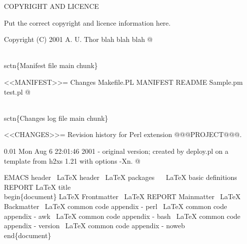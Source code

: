 \documentclass[11pt]{article}
\def\nwendcode{\endtrivlist \endgroup} %
\let\nwdocspar=\par                    %
\begin{document}
COPYRIGHT AND LICENCE

Put the correct copyright and licence information here.

Copyright (C) 2001 A. U. Thor blah blah blah
@ 
\nwendcode{}\nwdocspar

\nwenddocs{}\plusendmoddef
\\sctn\{Manifest file main chunk\}

<<MANIFEST>>=
Changes
Makefile.PL
MANIFEST
README
Sample.pm
test.pl
@ 
\nwendcode{}\nwdocspar

\nwenddocs{}\plusendmoddef
\\sctn\{Changes log file main chunk\}

<<CHANGES>>=
Revision history for Perl extension @@@PROJECT@@@.

0.01  Mon Aug  6 22:01:46 2001
        - original version; created by deploy.pl on
          a template from h2xs 1.21 with options -Xn.
@ 
\nwendcode{}\nwdocspar


\nwenddocs{}\endmoddef
\LA{}EMACS header~{\nwtagstyle{}}\RA{}
\LA{}LaTeX header~{\nwtagstyle{}}\RA{}
\LA{}LaTeX packages~{\nwtagstyle{}}\RA{}
\ %
\LA{}LaTeX basic definitions~{\nwtagstyle{}}\RA{}
\LA{}REPORT LaTeX title~{\nwtagstyle{}}\RA{}
%
%
\\begin\{document\}
%
\LA{}LaTeX Frontmatter~{\nwtagstyle{}}\RA{}
\LA{}LaTeX REPORT Mainmatter~{\nwtagstyle{}}\RA{}
\LA{}LaTeX Backmatter~{\nwtagstyle{}}\RA{}
%
\LA{}LaTeX common code appendix - perl~{\nwtagstyle{}}\RA{}
\LA{}LaTeX common code appendix - awk~{\nwtagstyle{}}\RA{}
\LA{}LaTeX common code appendix - bash~{\nwtagstyle{}}\RA{}
\LA{}LaTeX common code appendix - version~{\nwtagstyle{}}\RA{}
\LA{}LaTeX common code appendix - noweb~{\nwtagstyle{}}\RA{}
%
\\end\{document\}
%
\nwendcode{}\nwdocspar
\end{document}
